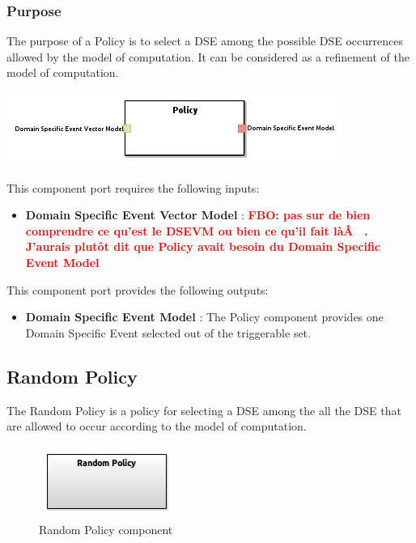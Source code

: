 \documentclass{gemoc} %
\begin{document}
\subsubsection{Purpose}
The purpose of a Policy is to select a DSE among the possible DSE occurrences allowed by the model of computation. It can be considered as a refinement of the model of computation.
\begin{center}
\includegraphics*[trim=0.0cm 0.0cm 0cm 0.0cm, clip=true]{../images/generated/Generated_Policy.png}
\end{center}

This component port requires the following inputs:
\begin{itemize}
  \item \textbf{Domain Specific Event Vector Model} :
\textbf{\textcolor{red}{FBO: pas sur de bien comprendre ce qu'est le DSEVM ou bien ce qu'il fait l\`aÂ  . J'aurais plut\^ot dit que Policy avait besoin du Domain Specific Event Model}}
\end{itemize}

This component port provides the following outputs:
\begin{itemize}
  \item \textbf{Domain Specific Event Model} :
The Policy component provides one Domain Specific Event selected out of the triggerable set.
\end{itemize}

\subsection{Random Policy}
The Random Policy is a policy for selecting a DSE among the all the DSE that are allowed to occur according to the model of computation.
\begin{figure}[htp]
	\begin{center}
	\includegraphics*[trim=0.0cm 0.0cm 0cm 0.0cm, clip=true, scale=1.0]{../images/generated/Generated_Random Policy.jpg}
	\caption{Random Policy component}
	\end{center}
\end{figure}
\end{document}
